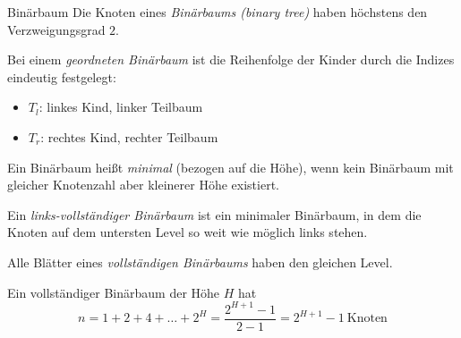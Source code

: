 \documentclass[german]{../spicker}
\begin{document}

\begin{defi}{Binärbaum}
    Die Knoten eines \emph{Binärbaums (binary tree)} haben höchstens den Verzweigungsgrad $2$.

    Bei einem \emph{geordneten Binärbaum} ist die Reihenfolge der Kinder durch die Indizes eindeutig festgelegt:
    \begin{itemize}
        \item $T_l$: linkes Kind, linker Teilbaum
        \item $T_r$: rechtes Kind, rechter Teilbaum
    \end{itemize}

    Ein Binärbaum heißt \emph{minimal} (bezogen auf die Höhe), wenn kein Binärbaum mit gleicher Knotenzahl aber kleinerer Höhe existiert.

    Ein \emph{links-vollständiger Binärbaum} ist ein minimaler Binärbaum, in dem die Knoten auf dem untersten Level so weit wie möglich links stehen.

    Alle Blätter eines \emph{vollständigen Binärbaums} haben den gleichen Level.

    Ein vollständiger Binärbaum der Höhe $H$ hat
    $$
        n = 1 + 2 + 4 + \ldots + 2^H = \frac{2^{H+1}-1}{2-1} = 2^{H+1}-1 \ \text{Knoten}
    $$
\end{defi}
\end{document}
